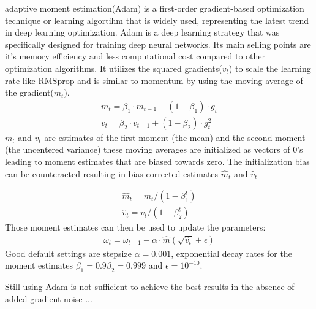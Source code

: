 \documentclass[
a4paper, 
12pt,
grayscalebody, %
abstract=on,
twoside, BCOR10mm, 12pt, DIV13,headinclude, footexclude, final, abstracton, openright
]{ibireprt}
\numberwithin{equation}{chapter}
\numberwithin{table}{chapter}
\numberwithin{figure}{chapter}
\numberwithin{algorithm}{chapter}
\numberwithin{example}{chapter}
\numberwithin{example}{chapter}
\begin{document}
adaptive moment estimation(Adam)\cite{Kingma2014} is a first-order gradient-based optimization technique or learning algortihm that is widely used, representing the latest trend in deep learning optimization. Adam is a deep learning strategy that was specifically designed for training deep neural networks. Its main selling points are it's memory efficiency and less computational cost compared to other optimization algorithms. It  utilizes the squared gradients($v_t$) to scale the learning rate like RMSprop and  is similar to momentum by using the moving average of the gradient($m_t$).%
\begin{align}
	m_t =\beta_1\cdot m_{t-1} + (1- \beta_1)\cdot g_t \\
	v_t =\beta_2\cdot v_{t-1} + (1- \beta_2)\cdot g_t^2
\end{align}
$m_t$ and $v_t$ are estimates of the first moment (the mean) and the second moment (the uncentered
variance) these moving averages are initialized as vectors of 0's leading to moment estimates that are  biased towards zero. The initialization bias can be counteracted resulting in bias-corrected estimates $\hat{m}_t$ and $\hat{v}_t$

\begin{align}
		\hat{m}_t = m_t/(1- \beta_1^t)\\
	\hat{v}_t = v_t/(1- \beta_2^t)
\end{align}
Those moment estimates can then be used to update the parameters: 
\begin{align}
	\omega_t = \omega_{t-1}-\alpha\cdot\hat{m}(\sqrt{\hat{v}_t}+\epsilon)
\end{align}
Good default settings are stepsize $\alpha = 0.001$, exponential decay rates for the moment estimates $\beta_1 = 0.9 \beta_2 = 0.999 $ and $\epsilon =  10^{-10}$.



Still using Adam is not sufficient to achieve the best results in the absence of added gradient noise \cite{Neelakantan2015}...%


\end{document}
